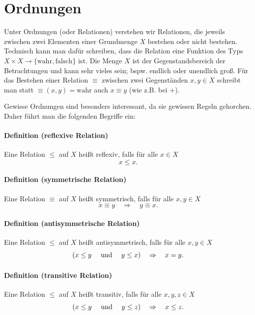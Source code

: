 \documentclass[a4paper,11pt,abstracton]{scrartcl}
\begin{document}
\section{Ordnungen}
Unter Ordnungen (oder Relationen) verstehen wir Relationen, die jeweils zwischen zwei Elementen einer Grundmenge $X$ bestehen oder nicht bestehen. Technisch kann man dafür schreiben, dass die Relation eine Funktion des Typs $X \times X \to \{ \mathrm{wahr}, \mathrm{falsch}\}$ ist. Die Menge $X$ ist der Gegenstandsbereich der Betrachtungen und kann sehr vieles sein; bspw. endlich oder unendlich groß. Für das Bestehen einer Relation $\equiv$ zwischen zwei Gegenständen $x,y \in X$ schreibt man statt $\equiv (x,y) = \mathrm{wahr}$ auch $x \equiv y$ (wie z.B. bei $+$).

Gewisse Ordnungen sind besonders interessant, da sie gewissen Regeln gehorchen. Daher führt man die folgenden Begriffe ein:
\paragraph{Definition (reflexive Relation)} Eine Relation $\leq$ auf $X$ heißt reflexiv, falls für alle $x \in X$
\begin{equation}
 x \leq x.
\end{equation}
\paragraph{Definition (symmetrische Relation)} Eine Relation $\equiv$ auf $X$ heißt symmetrisch, falls für alle $x,y \in X$
\begin{equation}
 x \equiv y \quad \Rightarrow \quad y \equiv x.
\end{equation}
\paragraph{Definition (antisymmetrische Relation)} Eine Relation $\leq$ auf $X$ heißt antisymmetrisch, falls für alle $x,y \in X$
\begin{equation}
 (x \leq y \quad \textnormal{ und } \quad y \leq x) \quad \Rightarrow \quad x = y.
\end{equation}
\paragraph{Definition (transitive Relation)} Eine Relation $\leq$ auf $X$ heißt transitiv, falls für alle $x,y,z \in X$
\begin{equation}
 (x \leq y \quad \textnormal{ und } \quad y \leq z) \quad \Rightarrow \quad x \leq z.
\end{equation}
\end{document}
